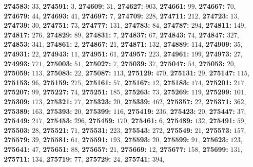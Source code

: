\textsf{\bfseries 274583:} $33$, \textsf{\bfseries 274591:} $3$, \textsf{\bfseries 274609:} $31$, \textsf{\bfseries 274627:} $903$, \textsf{\bfseries 274661:} $99$, \textsf{\bfseries 274667:} $70$, \textsf{\bfseries 274679:} $44$, \textsf{\bfseries 274693:} $41$, \textsf{\bfseries 274697:} $7$, \textsf{\bfseries 274709:} $228$, \textsf{\bfseries 274711:} $212$, \textsf{\bfseries 274723:} $13$, \textsf{\bfseries 274739:} $30$, \textsf{\bfseries 274751:} $73$, \textsf{\bfseries 274777:} $131$, \textsf{\bfseries 274783:} $84$, \textsf{\bfseries 274787:} $294$, \textsf{\bfseries 274811:} $149$, \textsf{\bfseries 274817:} $276$, \textsf{\bfseries 274829:} $89$, \textsf{\bfseries 274831:} $7$, \textsf{\bfseries 274837:} $67$, \textsf{\bfseries 274843:} $74$, \textsf{\bfseries 274847:} $327$, \textsf{\bfseries 274853:} $341$, \textsf{\bfseries 274861:} $2$, \textsf{\bfseries 274867:} $21$, \textsf{\bfseries 274871:} $132$, \textsf{\bfseries 274889:} $114$, \textsf{\bfseries 274909:} $35$, \textsf{\bfseries 274931:} $22$, \textsf{\bfseries 274943:} $11$, \textsf{\bfseries 274951:} $61$, \textsf{\bfseries 274957:} $223$, \textsf{\bfseries 274961:} $199$, \textsf{\bfseries 274973:} $27$, \textsf{\bfseries 274993:} $771$, \textsf{\bfseries 275003:} $51$, \textsf{\bfseries 275027:} $7$, \textsf{\bfseries 275039:} $37$, \textsf{\bfseries 275047:} $54$, \textsf{\bfseries 275053:} $20$, \textsf{\bfseries 275059:} $113$, \textsf{\bfseries 275083:} $22$, \textsf{\bfseries 275087:} $113$, \textsf{\bfseries 275129:} $470$, \textsf{\bfseries 275131:} $29$, \textsf{\bfseries 275147:} $115$, \textsf{\bfseries 275153:} $96$, \textsf{\bfseries 275159:} $275$, \textsf{\bfseries 275161:} $57$, \textsf{\bfseries 275167:} $12$, \textsf{\bfseries 275183:} $174$, \textsf{\bfseries 275201:} $217$, \textsf{\bfseries 275207:} $99$, \textsf{\bfseries 275227:} $74$, \textsf{\bfseries 275251:} $185$, \textsf{\bfseries 275263:} $73$, \textsf{\bfseries 275269:} $119$, \textsf{\bfseries 275299:} $101$, \textsf{\bfseries 275309:} $173$, \textsf{\bfseries 275321:} $77$, \textsf{\bfseries 275323:} $20$, \textsf{\bfseries 275339:} $462$, \textsf{\bfseries 275357:} $22$, \textsf{\bfseries 275371:} $362$, \textsf{\bfseries 275389:} $163$, \textsf{\bfseries 275393:} $20$, \textsf{\bfseries 275399:} $116$, \textsf{\bfseries 275419:} $236$, \textsf{\bfseries 275423:} $20$, \textsf{\bfseries 275447:} $37$, \textsf{\bfseries 275449:} $217$, \textsf{\bfseries 275453:} $296$, \textsf{\bfseries 275459:} $170$, \textsf{\bfseries 275461:} $6$, \textsf{\bfseries 275489:} $132$, \textsf{\bfseries 275491:} $59$, \textsf{\bfseries 275503:} $28$, \textsf{\bfseries 275521:} $71$, \textsf{\bfseries 275531:} $223$, \textsf{\bfseries 275543:} $272$, \textsf{\bfseries 275549:} $21$, \textsf{\bfseries 275573:} $157$, \textsf{\bfseries 275579:} $39$, \textsf{\bfseries 275581:} $61$, \textsf{\bfseries 275591:} $193$, \textsf{\bfseries 275593:} $20$, \textsf{\bfseries 275599:} $91$, \textsf{\bfseries 275623:} $123$, \textsf{\bfseries 275641:} $47$, \textsf{\bfseries 275651:} $88$, \textsf{\bfseries 275657:} $21$, \textsf{\bfseries 275669:} $12$, \textsf{\bfseries 275677:} $158$, \textsf{\bfseries 275699:} $131$, \textsf{\bfseries 275711:} $134$, \textsf{\bfseries 275719:} $77$, \textsf{\bfseries 275729:} $24$, \textsf{\bfseries 275741:} $394$, 
